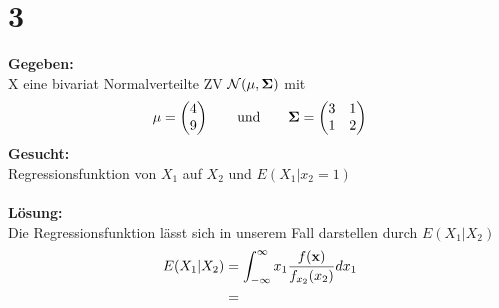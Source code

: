 \documentclass{article}
\begin{document}
\section*{3} 
\textbf{Gegeben:} \\

X eine bivariat Normalverteilte ZV $\mathcal{N}(\bf{\mu}, \bf{\Sigma})$ mit \[ \bf{\mu} = \begin{pmatrix}
    4 \\
    9
\end{pmatrix} \qquad \text{und} \qquad \bf{\Sigma} = \begin{pmatrix}
    3&1\\
    1&2
\end{pmatrix}\]
\textbf{Gesucht:}\\

Regressionsfunktion von $X_1$ auf $X_2$ und $E(X_1|x_2 = 1)$ \\\\
\textbf{Lösung:} \\

Die Regressionsfunktion lässt sich in unserem Fall darstellen durch $E(X_1|X_2)$ 
\begin{align*}
    E(X_1|X_2) &= \int_{-\infty}^{\infty} x_1 \frac{f(\bf{x})}{f_{x_2}(x_2)}  dx_1\\
    &= 
\end{align*}
\end{document}
